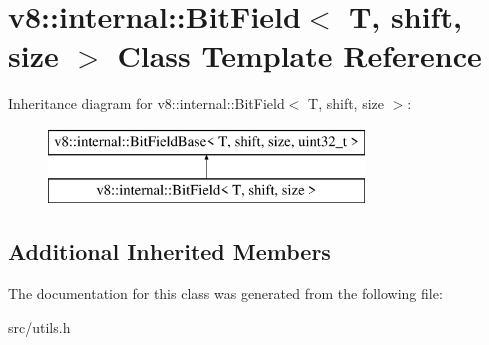 \hypertarget{classv8_1_1internal_1_1_bit_field}{}\section{v8\+:\+:internal\+:\+:Bit\+Field$<$ T, shift, size $>$ Class Template Reference}
\label{classv8_1_1internal_1_1_bit_field}
Inheritance diagram for v8\+:\+:internal\+:\+:Bit\+Field$<$ T, shift, size $>$\+:\begin{figure}[H]
\begin{center}
\leavevmode
\includegraphics[height=2.000000cm]{classv8_1_1internal_1_1_bit_field}
\end{center}
\end{figure}
\subsection*{Additional Inherited Members}


The documentation for this class was generated from the following file\+:\begin{DoxyCompactItemize}
\item 
src/utils.\+h\end{DoxyCompactItemize}
